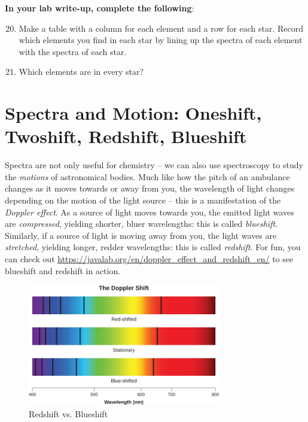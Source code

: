 \documentclass[11pt]{article}
\begin{document}
\textbf{In your lab write-up, complete the following}:
\begin{enumerate}
    \setcounter{enumi}{19}
    
    \item Make a table with a column for each element and a row for each star. Record which elements you find in each star by lining up the spectra of each element with the spectra of each star.
    
    \item Which elements are in every star?
    
\end{enumerate}


\section{Spectra and Motion: Oneshift, Twoshift, Redshift, Blueshift}

Spectra are not only useful for chemistry -- we can also use spectroscopy to study the \emph{motions} of astronomical bodies. Much like how the pitch of an ambulance changes as it moves towards or away from you, the wavelength of light changes depending on the motion of the light source -- this is a manifestation of the \emph{Doppler effect}. As a source of light moves towards you, the emitted light waves are \emph{compressed}, yielding shorter, bluer wavelengths: this is called \emph{blueshift}. Similarly, if a source of light is moving away from you, the light waves are \emph{stretched}, yielding longer, redder wavelengths: this is called \emph{redshift}. For fun, you can check out \url{https://javalab.org/en/doppler_effect_and_redshift_en/} to see blueshift and redshift in action. 

\begin{figure}[h!]
    \centering
    \includegraphics[width=0.75\textwidth]{Images/redshift.jpg}
    \caption{Redshift vs. Blueshift}
    \label{fig:redshift}
\end{figure}
\end{document}
